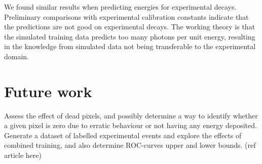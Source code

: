 We found similar results when predicting energies for experimental decays. Preliminary comparisons
with experimental calibration constants indicate that the predictions are not good on experimental
decays. The working theory is that the simulated training data predicts too many photons per unit
energy, resulting in the knowledge from simulated data not being transferable to the experimental
domain.

\section{Future work}

Assess the effect of dead pixels, and possibly determine a way to identify whether a given
pixel is zero due to erratic behaviour or not having any energy deposited.
Generate a dataset of labelled experimental events and explore the effects of combined training,
and also determine ROC-curves upper and lower bounds. (ref article here)